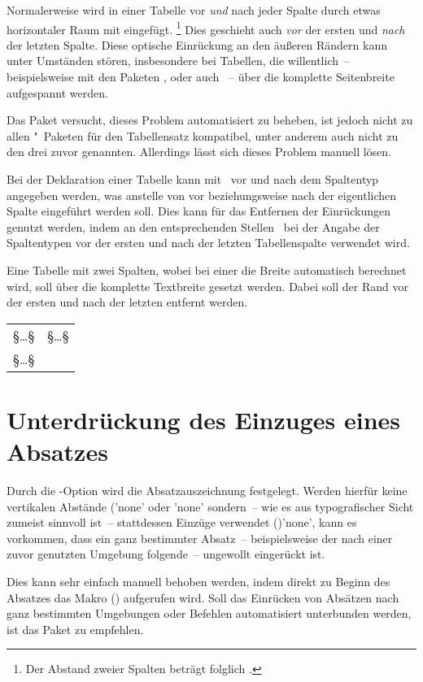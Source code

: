 Normalerweise wird in einer Tabelle vor \emph{und} nach jeder Spalte durch 
 etwas horizontaler Raum mit  
eingefügt.%
\footnote{%
  Der Abstand zweier Spalten beträgt folglich .%
}
Dies geschieht auch \emph{vor} der ersten und \emph{nach} der letzten Spalte. 
Diese optische Einrückung an den äußeren Rändern kann unter Umständen stören, 
insbesondere bei Tabellen, die willentlich~-- beispielsweise mit den Paketen 
,  oder auch ~-- über die 
komplette Seitenbreite aufgespannt werden.

Das Paket  versucht, dieses Problem automatisiert zu 
beheben, ist jedoch nicht zu allen "~Paketen für den 
Tabellensatz kompatibel, unter anderem auch nicht zu den drei zuvor genannten. 
Allerdings lässt sich dieses Problem manuell lösen. 

Bei der Deklaration einer Tabelle kann mit~\MPValue{\dots} vor und 
nach dem Spaltentyp angegeben werden, was anstelle von  vor 
beziehungsweise nach der eigentlichen Spalte eingeführt werden soll. Dies kann 
für das Entfernen der Einrückungen genutzt werden, indem an den entsprechenden 
Stellen~ bei der Angabe der Spaltentypen vor der ersten und 
nach der letzten Tabellenspalte verwendet wird.
%
\begin{Example}
Eine Tabelle mit zwei Spalten, wobei bei einer die Breite automatisch berechnet 
wird, soll über die komplette Textbreite gesetzt werden. Dabei soll der Rand 
vor der ersten und nach der letzten entfernt werden.
\begin{Code}
\begin{tabularx}{\textwidth}{@{}lX@{}}
§\dots§ & §\dots§ \tabularnewline
§\dots§
\end{tabularx}
\end{Code}
\end{Example}



\section{%
  Unterdrückung des Einzuges eines Absatzes%
}
\begin{Entity}{}
Durch die \KOMAScript-Option  wird
die Absatzauszeichnung  festgelegt. Werden hierfür keine vertikalen Abstände 
('none' oder 'none' sondern~-- wie es 
aus typografischer Sicht zumeist sinnvoll ist~-- stattdessen Einzüge verwendet 
()'none', kann es vorkommen, dass ein ganz bestimmter 
Absatz~-- beispielsweise der nach einer zuvor genutzten Umgebung folgende~-- 
ungewollt eingerückt ist.
\end{Entity}
Dies kann sehr einfach manuell behoben werden, indem direkt zu Beginn des 
Absatzes das Makro () aufgerufen wird. Soll 
das Einrücken von Absätzen nach ganz bestimmten Umgebungen oder Befehlen 
automatisiert unterbunden werden, ist das Paket  zu 
empfehlen.



